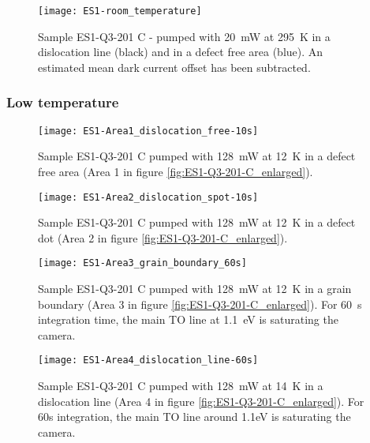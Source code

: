 \begin{figure}[H]
\centering
\texttt{[image: ES1-room\_temperature]} %
\caption[ES1-Q3-201 at room temperature]{Sample ES1-Q3-201 C - pumped with 20~mW at 295~K in a dislocation line (black) and in a defect free area (blue). An estimated mean dark current offset has been subtracted.}
\label{fig:ES1-room_temperature}%
\end{figure}


\subsubsection{Low temperature}

\begin{figure}[H]
\centering
\texttt{[image: ES1-Area1\_dislocation\_free-10s]}
\caption[ES1-Q3-201 at a defect free area]{Sample ES1-Q3-201 C pumped with 128~mW at 12~K in a defect free area (Area 1 in figure \ref{fig:ES1-Q3-201-C_enlarged}).}
\label{fig:ES1-Area1_dislocation_free-10s}%
\end{figure}

\begin{figure}[H]
\centering
\texttt{[image: ES1-Area2\_dislocation\_spot-10s]}
\caption[ES1-Q3-201 at a defect free area]{Sample ES1-Q3-201 C pumped with 128~mW at 12~K in a defect dot (Area 2 in figure \ref{fig:ES1-Q3-201-C_enlarged}).}
\label{fig:ES1-Area2_dislocation_spot-10s}%
\end{figure}


\begin{figure}[H]
\centering
\texttt{[image: ES1-Area3\_grain\_boundary\_60s]}
\caption[ES1-Q3-201 at a grain boundary]{Sample ES1-Q3-201 C pumped with 128~mW at 12~K in a grain boundary (Area 3 in figure \ref{fig:ES1-Q3-201-C_enlarged}). For 60~s integration time, the main TO line at 1.1~eV is saturating the camera.}
\label{fig:ES1-Area3_grain_boundary_60s}%
\end{figure}

\begin{figure}[H]
\centering
\texttt{[image: ES1-Area4\_dislocation\_line-60s]}
\caption[ES1-Q3-201 at a dislocation line]{Sample ES1-Q3-201 C pumped with 128~mW at 14~K in a dislocation line (Area 4 in figure \ref{fig:ES1-Q3-201-C_enlarged}). For 60s integration, the main TO line around 1.1eV is saturating the camera.}
\label{fig:ES1-Area4_dislocation_line-60s}%
\end{figure}




